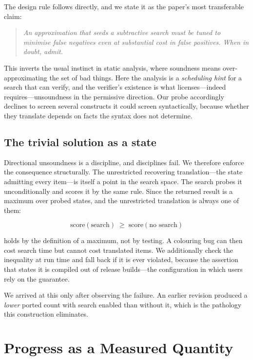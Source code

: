 \documentclass[10pt,twocolumn]{article}
\begin{document}
The design rule follows directly, and we state it as the paper's most
transferable claim:

\begin{quote}
\emph{An approximation that seeds a subtractive search must be tuned to
minimise false negatives even at substantial cost in false positives. When in
doubt, admit.}
\end{quote}

This inverts the usual instinct in static analysis, where soundness means
over-approximating the set of bad things. Here the analysis is a
\emph{scheduling hint} for a search that can verify, and the verifier's
existence is what licenses---indeed requires---unsoundness in the permissive
direction. Our probe accordingly declines to screen several constructs it
could screen syntactically, because whether they translate depends on facts
the syntax does not determine.

\subsection{The trivial solution as a state}
\label{sec:baseline}

Directional unsoundness is a discipline, and disciplines fail. We therefore
enforce the consequence structurally. The unrestricted recovering
translation---the state admitting every item---is itself a point in the search
space. The search probes it unconditionally and scores it by the same rule.
Since the returned result is a maximum over probed states, and the
unrestricted translation is always one of them:

\[
\mathrm{score}(\text{search}) \;\ge\; \mathrm{score}(\text{no search})
\]

\noindent holds by the definition of a maximum, not by testing. A colouring
bug can then cost search time but cannot cost translated items. We
additionally check the inequality at run time and fall back if it is ever
violated, because the assertion that states it is compiled out of release
builds---the configuration in which users rely on the guarantee.

We arrived at this only after observing the failure. An earlier revision
produced a \emph{lower} ported count with search enabled than without it,
which is the pathology this construction eliminates.

\section{Progress as a Measured Quantity}
\label{sec:progress}
\end{document}
